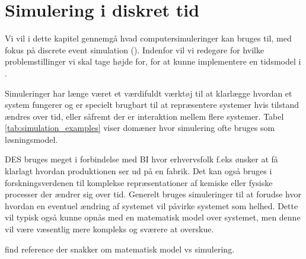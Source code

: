 \chapter{Simulering i diskret tid}
Vi vil i dette kapitel gennemgå hvad computersimuleringer kan bruges til, med fokus på discrete event simulation (\des). Indenfor \des vil vi redegøre for hvilke problemstillinger vi skal tage højde for, for at kunne implementere en \des tidsmodel i \pycsp. 

Simuleringer har længe været et værdifuldt værktøj til at klarlægge hvordan et system fungerer og er specielt brugbart til at repræsentere systemer hvis 
tilstand ændres over tid, eller såfremt der er interaktion mellem flere systemer. Tabel \ref{tab:simulation_examples} viser domæner hvor simulering ofte bruges som løsningsmodel. 

DES bruges meget i forbindelse med BI hvor erhvervsfolk f.eks ønsker at få klarlagt hvordan produktionen ser ud på en fabrik. Det kan også bruges i forskningsverdenen til komplekse repræsentationer af kemiske eller fysiske processer der ændrer sig over tid. 
Generelt bruges simuleringer til at forudse hvor hvordan en eventuel ændring af systemet vil påvirke systemet som helhed. Dette vil typisk også kunne opnås med en matematisk model over systemet, men denne vil være væsentlig mere kompleks og sværere at overskue. 

find reference der snakker om matematisk model vs simulering. 


